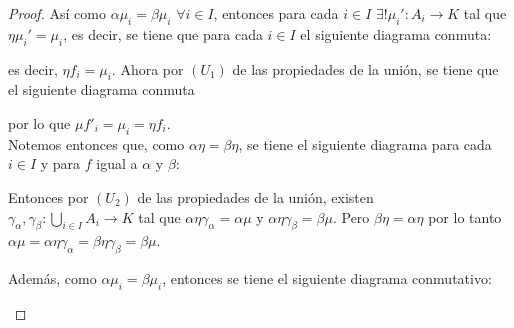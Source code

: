 \documentclass{article}
\begin{document}
\begin{enumerate}[label=\textbf{Ej \arabic*.}]
\begin{proof}
Así como $\alpha\mu_i=\beta\mu_i\,\,\forall i\in I$, entonces para cada $i\in I$ $\exists ! \mu_i':A_i\to K$ tal que $\eta\mu_i'=\mu_i$, es decir, se tiene que 
para cada $i\in I$ el siguiente diagrama conmuta:

\centerline{
}
es decir, $\eta f_i=\mu_i$. Ahora por $(U_1)$ de las propiedades de la unión, se tiene que el siguiente diagrama conmuta

 \centerline{
}

por lo que $\mu f'_i=\mu_i=\eta f_i$.\\

Notemos entonces que, como $\alpha\eta=\beta\eta$, se tiene el siguiente diagrama para cada $i\in I$ y para $f$ igual a $\alpha$ y $\beta$:


Entonces por $(U_2)$ de las propiedades de la unión, existen \\$\gamma_\alpha,\gamma_\beta:\displaystyle\bigcup_{i\in I}A_i\longrightarrow K$ tal que 
$\alpha\eta\gamma_\alpha=\alpha\mu$ y $\alpha\eta\gamma_\beta=\beta\mu$. Pero $\beta\eta=\alpha\eta$ por lo tanto 
$\alpha\mu=\alpha\eta\gamma_\alpha=\beta\eta\gamma_\beta=\beta\mu$. 













Además, como $\alpha\mu_i=\beta\mu_i$, entonces se tiene el siguiente diagrama conmutativo:

\centerline{
}


\end{proof}
\end{enumerate}
\end{document}
